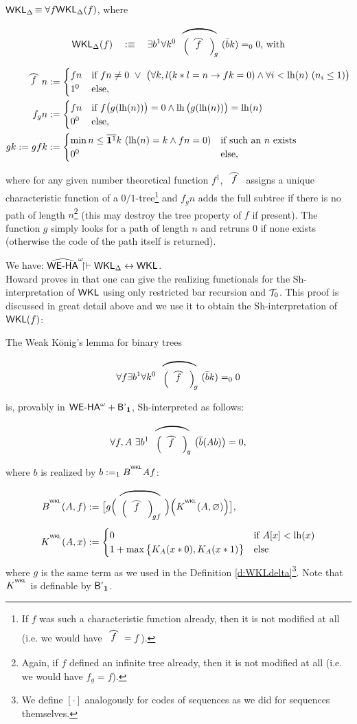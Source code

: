 \begin{dfn}{{$\textsf{\upshape WKL}_\Delta$}$\equiv\forall f\textsf{\upshape WKL}_\Delta(f)$},
\label{d:frown_g} where
\[
\WKL_\Delta(f)\quad :\equiv\quad\exists b^1\forall k^0\ 
  \widefr{\Big(\!\text{\widefr{f}}\Big)_{\!g}} (\bar bk)=_00\text{, with}
\]
\begin{align*}
\widefr{f}n&:=\begin{cases}
  fn &\Tif \ fn\neq0\ \vee\ 
       \big(\forall k,l(k*l=n\rightarrow fk=0)\wedge \forall i<\lh(n)\ 
(n_i\leq 1)\big)\\
  1^0 &\Telse, \end{cases} \\
f_gn&:=\begin{cases}
  fn &\Tif\ f\big(g(\lh(n))\big)=0\wedge \lh\big(g(\lh(n))\big)=\lh(n)\\
  0^0 &\Telse, \end{cases} \\
gk:=g f k&:=\begin{cases}
\min n\leq\overline{\one^1}k\ (\lh(n)=k \wedge fn=0)&\text{if such an $n$ 
exists}\\
0^0&\Telse,
\end{cases}
\end{align*}
where for any given number theoretical function $f^1$, 
$\widefr{f}$ assigns a unique characteristic function of a $0/1$-tree\footnote{
If $f$ was such a characteristic function already, then it is not modified at all (i.e. we would have $\widefr{f}=f$).}
and $f_gn$ adds the full subtree if there is no path of length $n$\footnote{
Again, if $f$ defined an infinite tree already, then it is not modified at all (i.e. we would have $f_g=f$).}
(this may destroy the tree property of $f$ if present). 
The function $g$ simply looks for a path of length $n$ and retruns $0$ if none exists (otherwise the code of the path itself is returned).
\end{dfn}
We have: $\widehat{\textsf{\upshape WE-HA}}^\omega\!\!\!\restriction\vdash\textsf{\upshape WKL}_\Delta\leftrightarrow\textsf{\upshape WKL}$. \\
Howard proves in \cite{Howard81} that one can give the realizing 
functionals for the Sh-interpretation of $\textsf{\upshape WKL}$ using only restricted bar 
recursion and $\mathcal{T}_0$. This proof is
discussed in great detail above and we use
it to obtain the Sh-interpretation of $\textsf{\upshape WKL}(f)$:
\begin{thm}\label{t:FIwkl}
The Weak K\"onig's lemma for binary trees
\[
  \forall f\exists b^1\forall k^0\ 
  \widefr{\Big(\!\text{\widefr{f}}\Big)_{\!g}} (\bar bk)=_00
\]
is, provably in ${\textsf{\upshape WE-HA}}^{\omega}+\textsf{\upshape B'}_{\mathbf1}$, Sh-interpreted as follows:
\[ \forall f,A\ \exists b^1\  \widefr{\Big(\!\text{\widefr{f}}\Big)_{\!g}} 
\big(\overline{b}(Ab)\big)=0
\text{,}\]
where $b$ is realized by $b:=_1B^{^{\textsf{\upshape WKL}}}Af$:
\begin{align*}
B^{^\WKL}(A,f)&:=\big[g\Big(\widefr{\Big(\!\text{\widefr{f}}\Big)_{\!gf}}
\Big) \Big(K^{^\WKL}
(A,\emptyset)\Big)\big] \text{,}  \\
K^{^\WKL}(A,x)&:=\KA{A}{x}  
\end{align*}
where $g$ is the same term as we used in the 
Definition \ref{d:WKLdelta}\footnote{We define $[\cdot]$ analogously 
for codes of sequences
as we did for sequences themselves.}.
Note that $K^{^{\textsf{\upshape WKL}}}$ is definable by $\textsf{\upshape B'}_{\mathbf1}$.
\end{thm}
